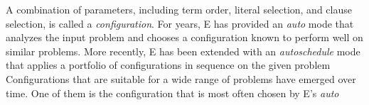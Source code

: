 A combination of parameters, including term order, literal
selection, and clause selection, is called a \emph{configuration}.
%
%
%
For years, E has provided an \emph{auto} mode that analyzes the input
problem and chooses a configuration known to perform well on similar problems.
More recently, E has been extended with an \emph{autoschedule} mode that
applies a portfolio of configurations in sequence on the given problem
Configurations that are suitable for a wide range of problems have emerged over
time. One of them is the configuration that is most often chosen by E's \emph{auto}
